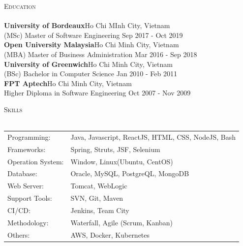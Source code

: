 \documentclass[a4paper]{article}
\newcommand{\lineunder} {
    \vspace*{-8pt} \\
    \hspace*{-18pt} \hrulefill \\
}
\newcommand{\header} [1] {
    {\hspace*{-18pt}\vspace*{6pt} \textsc{#1}}
    \vspace*{-6pt} \lineunder
}
\begin{document}
\header{Education}
\textbf{University of Bordeaux}\hfill Ho Chi MInh City, Vietnam\\
(MSc) Master of Software Engineering \hfill Sep 2017 - Oct 2019\\
\vspace{2mm}
\textbf{Open University Malaysia}\hfill Ho Chi Minh City, Vietnam\\
(MBA) Master of Business Administration \hfill Mar 2016 - Sep 2018\\
\vspace{2mm}
\textbf{University of Greenwich}\hfill Ho Chi Minh City, Vietnam\\
(BSc) Bachelor in Computer Science \hfill Jan 2010 - Feb 2011\\
\vspace{2mm}
\textbf{FPT Aptech}\hfill Ho Chi Minh City, Vietnam\\
Higher Diploma in Software Engineering \hfill Oct 2007 - Nov 2009\\
\vspace{2mm}

\header{Skills}
\begin{tabular}{ l l }
	Programming:                    & Java, Javascript, ReactJS, HTML, CSS, NodeJS, Bash                     \\
	Frameworks:                     & Spring, Struts, JSF, Selenium \\
	Operation System:               & Window, Linux(Ubuntu, CentOS)                                                \\
	Database:                       & Oracle, MySQL, PostgreQL, MongoDB                               \\
	Web Server:                     & Tomcat, WebLogic                                            \\
	Support Tools: 					& SVN, Git, Maven                                                     \\
	CI/CD:							& Jenkins, Team City \\
	Methodology:                    & Waterfall, Agile (Scrum, Kanban)                              \\
	Others:                         & AWS, Docker, Kubernetes                                       \\
\end{tabular}
\vspace{2mm}
\end{document}
